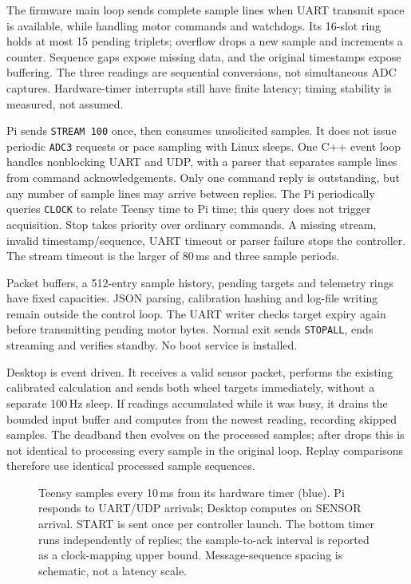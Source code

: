 The firmware main loop sends complete sample lines when UART transmit space is available, while handling motor commands and watchdogs. Its 16-slot ring holds at most 15 pending triplets; overflow drops a new sample and increments a counter. Sequence gaps expose missing data, and the original timestamps expose buffering. The three readings are sequential conversions, not simultaneous ADC captures. Hardware-timer interrupts still have finite latency; timing stability is measured, not assumed.

Pi sends \texttt{STREAM 100} once, then consumes unsolicited samples. It does not issue periodic \texttt{ADC3} requests or pace sampling with Linux sleeps. One C++ event loop handles nonblocking UART and UDP, with a parser that separates sample lines from command acknowledgements. Only one command reply is outstanding, but any number of sample lines may arrive between replies. The Pi periodically queries \texttt{CLOCK} to relate Teensy time to Pi time; this query does not trigger acquisition. Stop takes priority over ordinary commands. A missing stream, invalid timestamp/sequence, UART timeout or parser failure stops the controller. The stream timeout is the larger of 80\,ms and three sample periods.

Packet buffers, a 512-entry sample history, pending targets and telemetry rings have fixed capacities. JSON parsing, calibration hashing and log-file writing remain outside the control loop. The UART writer checks target expiry again before transmitting pending motor bytes. Normal exit sends \texttt{STOPALL}, ends streaming and verifies standby. No boot service is installed.

Desktop is event driven. It receives a valid sensor packet, performs the existing calibrated calculation and sends both wheel targets immediately, without a separate 100\,Hz sleep. If readings accumulated while it was busy, it drains the bounded input buffer and computes from the newest reading, recording skipped samples. The deadband then evolves on the processed samples; after drops this is not identical to processing every sample in the original loop. Replay comparisons therefore use identical processed sample sequences.

\begin{figure}[H]
\centering

\caption{Teensy samples every 10\,ms from its hardware timer (blue). Pi responds to UART/UDP arrivals; Desktop computes on SENSOR arrival. START is sent once per controller launch. The bottom timer runs independently of replies; the sample-to-ack interval is reported as a clock-mapping upper bound. Message-sequence spacing is schematic, not a latency scale.}
\label{fig:remote-timing}
\end{figure}

